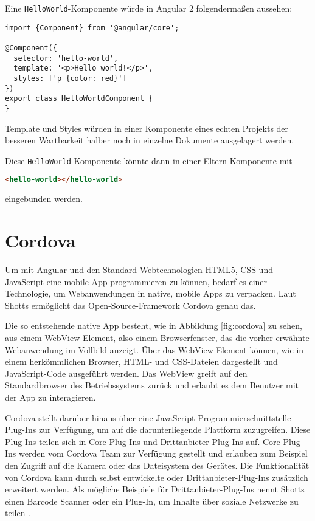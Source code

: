 Eine \texttt{HelloWorld}-Komponente würde in Angular 2 folgendermaßen aussehen:
\begin{codebox}
\begin{lstlisting}[style=typescript]
import {Component} from '@angular/core';

@Component({
  selector: 'hello-world',
  template: '<p>Hello world!</p>',
  styles: ['p {color: red}']
})
export class HelloWorldComponent {
}
\end{lstlisting}
\end{codebox}

Template und Styles würden in einer Komponente eines echten Projekts der besseren Wartbarkeit halber noch in einzelne Dokumente ausgelagert werden.

Diese \texttt{HelloWorld}-Komponente könnte dann in einer Eltern-Komponente mit
\begin{codebox}
\begin{lstlisting}[language=HTML]
<hello-world></hello-world>
\end{lstlisting}
\end{codebox}
eingebunden werden.

\section{Cordova}
Um mit Angular und den Standard-Webtechnologien HTML5, CSS und JavaScript eine mobile App programmieren zu können, bedarf es einer Technologie, um Webanwendungen in native, mobile Apps zu verpacken. Laut Shotts ermöglicht das Open-Source-Framework Cordova genau das. 

Die so entstehende native App besteht, wie in Abbildung \ref{fig:cordova} zu sehen, aus einem WebView-Element, also einem Browserfenster, das die vorher erwähnte Webanwendung im Vollbild anzeigt. Über das WebView-Element können, wie in einem herkömmlichen Browser, HTML- und CSS-Dateien dargestellt und JavaScript-Code ausgeführt werden. Das WebView greift auf den Standardbrowser des Betriebssystems zurück und erlaubt es dem Benutzer mit der App zu interagieren.

Cordova stellt darüber hinaus über eine JavaScript-Programmierschnittstelle Plug-Ins zur Verfügung, um auf die darunterliegende Plattform zuzugreifen. Diese Plug-Ins teilen sich in Core Plug-Ins und Drittanbieter Plug-Ins auf. Core Plug-Ins werden vom Cordova Team zur Verfügung gestellt und erlauben zum Beispiel den Zugriff auf die Kamera oder das Dateisystem des Gerätes. Die Funktionalität von Cordova kann durch selbst entwickelte oder Drittanbieter-Plug-Ins zusätzlich erweitert werden. Als mögliche Beispiele für Drittanbieter-Plug-Ins nennt Shotts einen Barcode Scanner oder ein Plug-In, um Inhalte über soziale Netzwerke zu teilen \cite{shotts:phonegap}.

